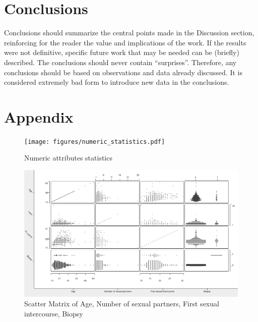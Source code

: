 \section{Conclusions}
Conclusions should summarize the central points made in the Discussion section, reinforcing for the reader the value and implications of the work. If the results were not definitive, specific future work that may be needed can be (briefly) described. The conclusions should never contain ``surprises''. Therefore, any conclusions should be based on observations and data already discussed. It is considered extremely bad form to introduce new data in the conclusions.




\clearpage
\onecolumn
\section{Appendix}

\begin{figure}[H]
    \centerline{
        \texttt{[image: figures/numeric\_statistics.pdf]}}
    \caption{Numeric attributes statistics}
    \label{numeric_attributes_statistics}
\end{figure}

\begin{figure}[H]
    \centerline{
        \includegraphics[width=0.9\paperwidth]{figures/scatter.png}}
    \caption{Scatter Matrix of Age, Number of sexual partners, First sexual intercourse, Biopsy}
    \label{scatter}
\end{figure}


